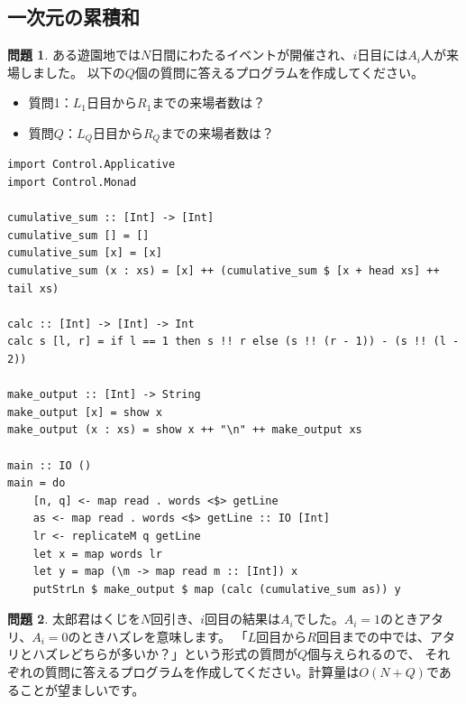\documentclass[12pt,a4paper,dvipdfmx,fleqn]{article}%
\theoremstyle{definition}
\newtheorem*{toi*}{問題}
\theoremstyle{definition}
\theoremstyle{definition}
\begin{document}
\subsection{一次元の累積和}\label{一次元の累積和}
\begin{toi*}
    ある遊園地では$N$日間にわたるイベントが開催され、$i$日目には$A_i$人が来場しました。
    以下の$Q$個の質問に答えるプログラムを作成してください。
    \begin{itemize}
        \item [] 質問1：$L_1$日目から$R_1$までの来場者数は？\\[2mm]
        \hspace{2em}{\vdots}
        \item [] 質問$Q$：$L_Q$日目から$R_Q$までの来場者数は？
    \end{itemize}
\end{toi*}
\begin{lstlisting}[caption=A06.hs,label=A06]
import Control.Applicative
import Control.Monad

cumulative_sum :: [Int] -> [Int]
cumulative_sum [] = []
cumulative_sum [x] = [x]
cumulative_sum (x : xs) = [x] ++ (cumulative_sum $ [x + head xs] ++ tail xs)

calc :: [Int] -> [Int] -> Int
calc s [l, r] = if l == 1 then s !! r else (s !! (r - 1)) - (s !! (l - 2))

make_output :: [Int] -> String
make_output [x] = show x
make_output (x : xs) = show x ++ "\n" ++ make_output xs

main :: IO ()
main = do
    [n, q] <- map read . words <$> getLine
    as <- map read . words <$> getLine :: IO [Int]
    lr <- replicateM q getLine
    let x = map words lr
    let y = map (\m -> map read m :: [Int]) x
    putStrLn $ make_output $ map (calc (cumulative_sum as)) y
\end{lstlisting}
\begin{toi*}
    太郎君はくじを$N$回引き、$i$回目の結果は$A_i$でした。$A_i=1$のときアタリ、$A_i=0$のときハズレを意味します。
    「$L$回目から$R$回目までの中では、アタリとハズレどちらが多いか？」という形式の質問が$Q$個与えられるので、
    それぞれの質問に答えるプログラムを作成してください。計算量は$O(N+Q)$であることが望ましいです。
\end{toi*}
\end{document}

